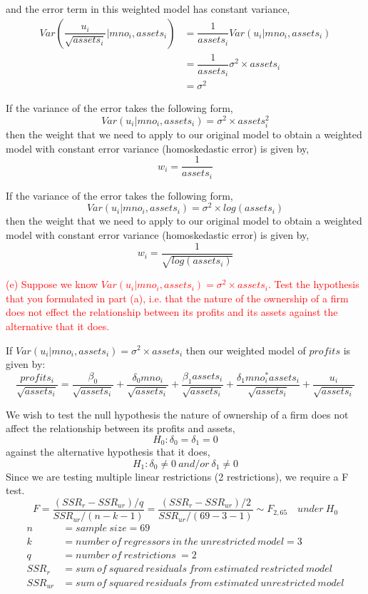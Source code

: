 \documentclass[12pt]{report}
\begin{document}
\noindent and the error term in this weighted model has constant variance,
\begin{align*}
Var(\dfrac{u_i}{\sqrt{assets_i}}|mno_i,assets_i) &= \dfrac{1}{assets_i}Var(u_i|mno_i,assets_i) \\
&= \dfrac{1}{assets_i}\sigma^2 \times assets_i \\
&= \sigma^2
\end{align*}

\noindent If the variance of the error takes the following form,
$$Var(u_i|mno_i, assets_i) = \sigma^2 \times assets_i^2$$
\noindent then the weight that we need to apply to our original model to obtain a weighted model with constant error variance (homoskedastic error) is given by,
$$w_i = \dfrac{1}{assets_i}$$

\noindent If the variance of the error takes the following form,
$$Var(u_i|mno_i, assets_i) = \sigma^2 \times log(assets_i)$$
\noindent then the weight that we need to apply to our original model to obtain a weighted model with constant error variance (homoskedastic error) is given by,
$$w_i = \dfrac{1}{\sqrt{log(assets_i)}}$$

\newpage
\noindent \textcolor{red}
{
	(e) Suppose we know $Var(u_i|mno_i,assets_i) = \sigma^2 \times assets_i$. Test the hypothesis that you formulated in part (a), i.e. that the nature of the ownership of a firm does not effect the relationship between its profits and its assets against the alternative that it does.
}

\noindent If $Var(u_i|mno_i,assets_i) = \sigma^2 \times assets_i$ then our weighted model of $profits$ is given by: $$\dfrac{profits_i}{\sqrt{assets_i}} = \dfrac{\beta_0}{\sqrt{assets_i}} + \dfrac{\delta_0mno_i}{\sqrt{assets_i}} + \dfrac{\beta_1assets_i}{\sqrt{assets_i}} + \dfrac{\delta_1mno_i^*assets_i}{\sqrt{assets_i}} + \dfrac{u_i}{\sqrt{assets_i}}$$

\noindent We wish to test the null hypothesis the nature of ownership of a firm does not affect the relationship between its profits and assets, $$H_0: \delta_0 = \delta_1 = 0$$ against the alternative hypothesis that it does, $$H_1:\delta_0 \neq 0\ and/or\ \delta_1 \neq 0$$ Since we are testing multiple linear restrictions (2 restrictions), we require a F test. $$F = \dfrac{(SSR_r - SSR_{ur})/q}{SSR_{ur}/(n-k-1)} = \dfrac{(SSR_r - SSR_{ur})/2}{SSR_{ur}/(69-3-1)} \sim F_{2,65} \quad under\ H_0$$
\begin{align*}
n &= sample\ size = 69 \\
k &= number\ of\ regressors\ in\ the\ unrestricted\ model = 3 \\
q &= number\ of\ restrictions\ = 2 \\
SSR_{r} &= sum\ of\ squared\ residuals\ from\ estimated\ restricted\ model \\
SSR_{ur} &= sum\ of\ squared\ residuals\ from\ estimated\ unrestricted\ model
\end{align*}
\end{document}
